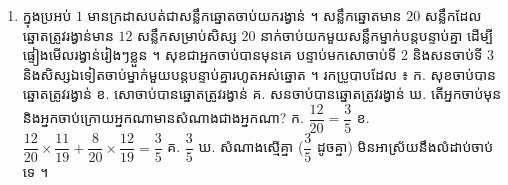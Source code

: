 \begin{enumerate}[1]
  \ans
  $n(S) = 36$ ។ ក. (ខៀវ, ក្រហម) $= (2, 1), (4, 2), (6, 3)$ ៖ $P = \dfrac{3}{36} = \dfrac{1}{12}$ \quad ខ. $(1,4), (2,3), (3,2), (4,1)$ ៖ $P = \dfrac{4}{36} = \dfrac{1}{9}$ ។
  \item ក្នុងប្រអប់ $1$ មានក្រដាសបត់ជាសន្លឹកឆ្នោតចាប់យករង្វាន់ ។ សន្លឹកឆ្នោតមាន $20$ សន្លឹកដែលឆ្នោតត្រូវរង្វាន់មាន $12$ សន្លឹកសម្រាប់សិស្ស $20$ នាក់ចាប់យកមួយសន្លឹកម្នាក់បន្តបន្ទាប់គ្នា ដើម្បីផ្ទៀងមើលរង្វាន់រៀងៗខ្លួន ។ សុខជាអ្នកចាប់បានមុនគេ បន្ទាប់មកសោចាប់ទី $2$ និងសនចាប់ទី $3$ និងសិស្សឯទៀតចាប់ម្នាក់មួយបន្តបន្ទាប់គ្នារហូតអស់ឆ្នោត ។ រកប្រូបាបដែល ៖ \quad ក. សុខចាប់បានឆ្នោតត្រូវរង្វាន់ \quad ខ. សោចាប់បានឆ្នោតត្រូវរង្វាន់ \quad គ. សនចាប់បានឆ្នោតត្រូវរង្វាន់ \quad ឃ. តើអ្នកចាប់មុននិងអ្នកចាប់ក្រោយអ្នកណាមានសំណាងជាងអ្នកណា?
  \ans
  ក. $\dfrac{12}{20} = \dfrac{3}{5}$ \quad ខ. $\dfrac{12}{20}\times\dfrac{11}{19} + \dfrac{8}{20}\times\dfrac{12}{19} = \dfrac{3}{5}$ \quad គ. $\dfrac{3}{5}$ \quad ឃ. សំណាងស្មើគ្នា ($\dfrac{3}{5}$ ដូចគ្នា) មិនអាស្រ័យនឹងលំដាប់ចាប់ទេ ។
\end{enumerate}
